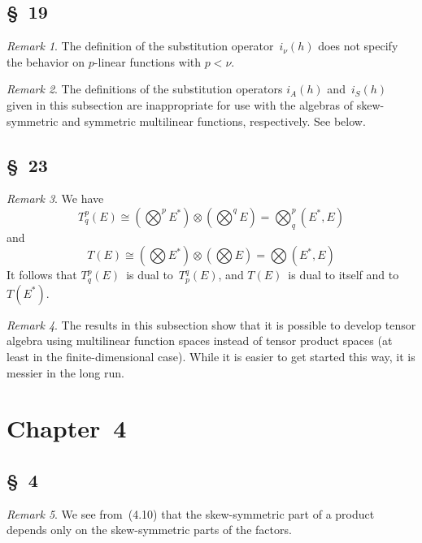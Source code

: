\documentclass[letterpaper,12pt]{article}
\newcommand{\iso}{\cong}
\newcommand{\tprod}{\otimes}
\newcommand{\bigtprod}{\bigotimes}
\newcommand{\medtprod}{{\textstyle\bigtprod}}
\theoremstyle{definition}
\theoremstyle{remark}
\newtheorem*{rmk}{Remark}
\begin{document}
\subsection*{\S~19}
\begin{rmk}
The definition of the substitution operator~\(i_{\nu}(h)\) does not specify the behavior on \(p\)-linear functions with \(p<\nu\).
\end{rmk}

\begin{rmk}
The definitions of the substitution operators \(i_A(h)\) and~\(i_S(h)\) given in this subsection are inappropriate for use with the algebras of skew-symmetric and symmetric multilinear functions, respectively. See below.
\end{rmk}

\subsection*{\S~23}
\begin{rmk}
We have
\[T^p_q(E)\iso(\medtprod^pE^*)\tprod(\medtprod^q E)=\medtprod^p_q(E^*,E)\]
and
\[T(E)\iso(\medtprod E^*)\tprod(\medtprod E)=\medtprod(E^*,E)\]
It follows that \(T^p_q(E)\)~is dual to~\(T^q_p(E)\), and \(T(E)\)~is dual to itself and to~\(T(E^*)\).
\end{rmk}

\begin{rmk}
The results in this subsection show that it is possible to develop tensor algebra using multilinear function spaces instead of tensor product spaces (at least in the finite-dimensional case). While it is easier to get started this way, it is messier in the long run.
\end{rmk}

\section*{Chapter~4}
\subsection*{\S~4}
\begin{rmk}
We see from~(4.10) that the skew-symmetric part of a product depends only on the skew-symmetric parts of the factors.
\end{rmk}
\end{document}
